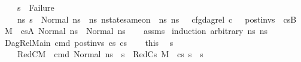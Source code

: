\begin{isabellebody}
\ \ \ \ s{\isacharprime}{\kern0pt}\ {\isasymnoteq}\ Failure\ {\isasymand}\ \isanewline
\ \ \ \ {\isacharparenleft}{\kern0pt}{\isasymforall}ns{}{\isacharprime}{\kern0pt}{\isachardot}{\kern0pt}\ s{\isacharprime}{\kern0pt}\ {\isacharequal}{\kern0pt}\ Normal\ ns{}{\isacharprime}{\kern0pt}\ {\isasymlongrightarrow}\ {\isacharparenleft}{\kern0pt}{\isasymexists}ns{}{\isacharprime}{\kern0pt}{\isachardot}{\kern0pt}\ nstate{\isacharunderscore}{\kern0pt}same{\isacharunderscore}{\kern0pt}on\ {\isasymLambda}\ ns{}{\isacharprime}{\kern0pt}\ ns{}{\isacharprime}{\kern0pt}\ {\isacharbraceleft}{\kern0pt}{\isacharbraceright}{\kern0pt}\ {\isasymand}\ cfg{\isacharunderscore}{\kern0pt}dag{\isacharunderscore}{\kern0pt}rel\ c\ {\isacharbrackleft}{\kern0pt}{\isacharbrackright}{\kern0pt}\ {\isacharbrackleft}{\kern0pt}{\isacharbrackright}{\kern0pt}\ post{\isacharunderscore}{\kern0pt}invs\ {\isacharbrackleft}{\kern0pt}{\isacharbrackright}{\kern0pt}\ cs{}B\ {\isasymand}\ {\isacharparenleft}{\kern0pt}M{\isacharcomma}{\kern0pt}{\isasymLambda}{\isacharcomma}{\kern0pt}{\isasymGamma}{\isacharcomma}{\kern0pt}{\isasymOmega}\ {\isasymturnstile}\ {\isasymlangle}cs{}A{\isacharcomma}{\kern0pt}\ Normal\ ns{}{\isasymrangle}\ {\isacharbrackleft}{\kern0pt}{\isasymrightarrow}{\isacharbrackright}{\kern0pt}\ Normal\ ns{}{\isacharprime}{\kern0pt}{\isacharparenright}{\kern0pt}{\isacharparenright}{\kern0pt}{\isacharparenright}{\kern0pt}{\isachardoublequoteclose}\isanewline
%
\isadelimproof
\ \ %
\endisadelimproof
%
\isatagproof
{}\isamarkupfalse%
\ assms\isanewline
{}\isamarkupfalse%
\ {\isacharparenleft}{\kern0pt}induction\ arbitrary{\isacharcolon}{\kern0pt}\ ns{}\ ns{}{\isacharparenright}{\kern0pt}\isanewline
\ \ \isamarkupfalse%
\ {\isacharparenleft}{\kern0pt}DagRel{\isacharunderscore}{\kern0pt}Main\ cmd\ post{\isacharunderscore}{\kern0pt}invs\ cs{}\ cs{}{\isacharparenright}{\kern0pt}\isanewline
\ \ \isamarkupfalse%
\ this\ \isamarkupfalse%
\ s{\isacharprime}{\kern0pt}{\isacharprime}{\kern0pt}\ \isanewline
\ \ \ \ RedC{}{\isacharcolon}{\kern0pt}{\isachardoublequoteopen}M{\isacharcomma}{\kern0pt}{\isasymLambda}{\isacharcomma}{\kern0pt}{\isasymGamma}{\isacharcomma}{\kern0pt}{\isasymOmega}\ {\isasymturnstile}\ {\isasymlangle}cmd{\isacharcomma}{\kern0pt}\ Normal\ ns{}{\isasymrangle}\ {\isasymrightarrow}\ s{\isacharprime}{\kern0pt}{\isacharprime}{\kern0pt}{\isachardoublequoteclose}\ \ RedCs{}{\isacharcolon}{\kern0pt}\ {\isachardoublequoteopen}M{\isacharcomma}{\kern0pt}{\isasymLambda}{\isacharcomma}{\kern0pt}{\isasymGamma}{\isacharcomma}{\kern0pt}{\isasymOmega}\ {\isasymturnstile}\ {\isasymlangle}cs{}{\isacharcomma}{\kern0pt}\ s{\isacharprime}{\kern0pt}{\isacharprime}{\kern0pt}{\isasymrangle}\ {\isacharbrackleft}{\kern0pt}{\isasymrightarrow}{\isacharbrackright}{\kern0pt}\ s{\isacharprime}{\kern0pt}{\isachardoublequoteclose}\isanewline

\end{isabellebody}
